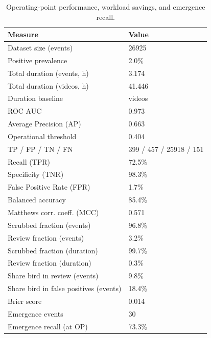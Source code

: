 \begin{table}
\caption{Operating-point performance, workload savings, and emergence recall.}
\label{tab:summary}
\begin{tabular}{ll}
\toprule
Measure & Value \\
\midrule
Dataset size (events) & 26925 \\
Positive prevalence & 2.0\% \\
Total duration (events, h) & 3.174 \\
Total duration (videos, h) & 41.446 \\
Duration baseline & videos \\
ROC AUC & 0.973 \\
Average Precision (AP) & 0.663 \\
Operational threshold & 0.404 \\
TP / FP / TN / FN & 399 / 457 / 25918 / 151 \\
Recall (TPR) & 72.5\% \\
Specificity (TNR) & 98.3\% \\
False Positive Rate (FPR) & 1.7\% \\
Balanced accuracy & 85.4\% \\
Matthews corr. coeff. (MCC) & 0.571 \\
Scrubbed fraction (events) & 96.8\% \\
Review fraction (events) & 3.2\% \\
Scrubbed fraction (duration) & 99.7\% \\
Review fraction (duration) & 0.3\% \\
Share bird in review (events) & 9.8\% \\
Share bird in false positives (events) & 18.4\% \\
Brier score & 0.014 \\
Emergence events & 30 \\
Emergence recall (at OP) & 73.3\% \\
\bottomrule
\end{tabular}
\end{table}
